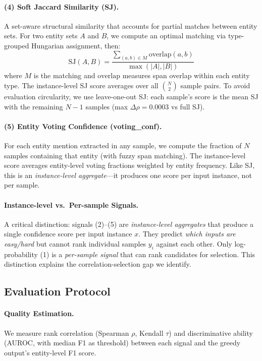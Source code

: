 \documentclass[11pt,a4paper]{article}
\begin{document}
\paragraph{(4) Soft Jaccard Similarity (SJ).}
A set-aware structural similarity that accounts for partial matches between entity sets.
For two entity sets $A$ and $B$, we compute an optimal matching via type-grouped Hungarian assignment, then:
\begin{equation}
\text{SJ}(A, B) = \frac{\sum_{(a,b) \in M} \text{overlap}(a,b)}{\max(|A|, |B|)}
\end{equation}
where $M$ is the matching and $\text{overlap}$ measures span overlap within each entity type.
The instance-level SJ score averages over all $\binom{N}{2}$ sample pairs.
To avoid evaluation circularity, we use leave-one-out SJ: each sample's score is the mean SJ with the remaining $N{-}1$ samples (max $\Delta\rho = 0.0003$ vs full SJ).

\paragraph{(5) Entity Voting Confidence (voting\_conf).}
For each entity mention extracted in any sample, we compute the fraction of $N$ samples containing that entity (with fuzzy span matching).
The instance-level score averages entity-level voting fractions weighted by entity frequency.
Like SJ, this is an \emph{instance-level aggregate}---it produces one score per input instance, not per sample.

\paragraph{Instance-level vs.\ Per-sample Signals.}
A critical distinction: signals (2)--(5) are \emph{instance-level aggregates} that produce a single confidence score per input instance $x$.
They predict \emph{which inputs are easy/hard} but cannot rank individual samples $y_i$ against each other.
Only log-probability (1) is a \emph{per-sample signal} that can rank candidates for selection.
This distinction explains the correlation-selection gap we identify.

\subsection{Evaluation Protocol}

\paragraph{Quality Estimation.}
We measure rank correlation (Spearman $\rho$, Kendall $\tau$) and discriminative ability (AUROC, with median F1 as threshold) between each signal and the greedy output's entity-level F1 score.
\end{document}
